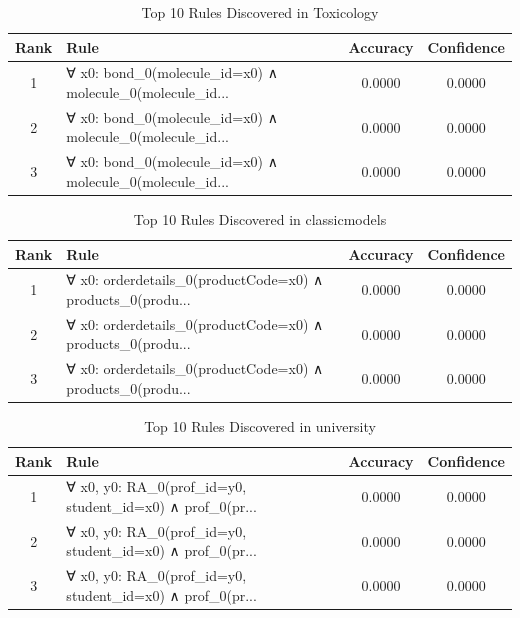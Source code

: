 \documentclass[11pt,a4paper]{article}
\begin{document}
\begin{table}[h!]
\centering
\small
\caption{Top 10 Rules Discovered in Toxicology}
\label{tab:rules_Toxicology}
\begin{tabular}{|c|p{5cm}|c|c|}
\hline
\textbf{Rank} & \textbf{Rule} & \textbf{Accuracy} & \textbf{Confidence} \\
\hline
1 & ∀ x0: bond\_0(molecule\_id=x0) ∧ molecule\_0(molecule\_id... & 0.0000 & 0.0000 \\
2 & ∀ x0: bond\_0(molecule\_id=x0) ∧ molecule\_0(molecule\_id... & 0.0000 & 0.0000 \\
3 & ∀ x0: bond\_0(molecule\_id=x0) ∧ molecule\_0(molecule\_id... & 0.0000 & 0.0000 \\
\hline
\end{tabular}
\end{table}

\begin{table}[h!]
\centering
\small
\caption{Top 10 Rules Discovered in classicmodels}
\label{tab:rules_classicmodels}
\begin{tabular}{|c|p{5cm}|c|c|}
\hline
\textbf{Rank} & \textbf{Rule} & \textbf{Accuracy} & \textbf{Confidence} \\
\hline
1 & ∀ x0: orderdetails\_0(productCode=x0) ∧ products\_0(produ... & 0.0000 & 0.0000 \\
2 & ∀ x0: orderdetails\_0(productCode=x0) ∧ products\_0(produ... & 0.0000 & 0.0000 \\
3 & ∀ x0: orderdetails\_0(productCode=x0) ∧ products\_0(produ... & 0.0000 & 0.0000 \\
\hline
\end{tabular}
\end{table}

\begin{table}[h!]
\centering
\small
\caption{Top 10 Rules Discovered in university}
\label{tab:rules_university}
\begin{tabular}{|c|p{5cm}|c|c|}
\hline
\textbf{Rank} & \textbf{Rule} & \textbf{Accuracy} & \textbf{Confidence} \\
\hline
1 & ∀ x0, y0: RA\_0(prof\_id=y0, student\_id=x0) ∧ prof\_0(pr... & 0.0000 & 0.0000 \\
2 & ∀ x0, y0: RA\_0(prof\_id=y0, student\_id=x0) ∧ prof\_0(pr... & 0.0000 & 0.0000 \\
3 & ∀ x0, y0: RA\_0(prof\_id=y0, student\_id=x0) ∧ prof\_0(pr... & 0.0000 & 0.0000 \\
\hline
\end{tabular}
\end{table}
\end{document}
